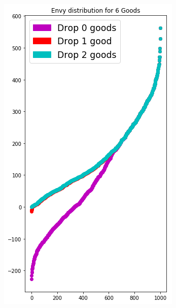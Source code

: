 \begin{figure}[h!]
\begin{subfigure}[b]{0.47\linewidth}
    \includegraphics[width=\linewidth]{images/envy_density/envy_density_us26.png}
    \caption{}
  \end{subfigure}
  \begin{subfigure}[b]{0.47\linewidth}

\end{subfigure}
\end{figure}
